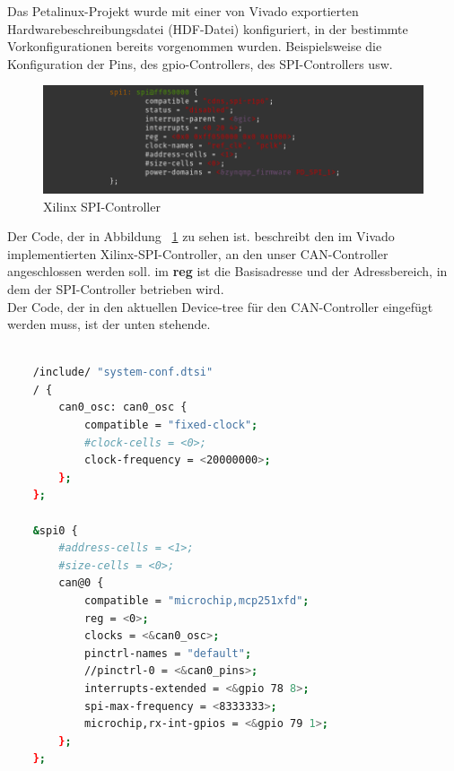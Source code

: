 Das Petalinux-Projekt wurde mit einer von Vivado exportierten Hardwarebeschreibungsdatei (HDF-Datei) konfiguriert, in der bestimmte Vorkonfigurationen bereits vorgenommen wurden. Beispielsweise die Konfiguration der Pins, des gpio-Controllers, des SPI-Controllers usw. 

\begin{figure}[H]
	\begin{center}		\includegraphics[width=1\textwidth]{./images/xilinx_spi_controller.jpg}
	\end{center}
	\vspace{-5pt}
	\caption[Xilinx SPI-Controller]{Xilinx SPI-Controller} %
	\label{fig:deviceTree:spi:controller}
	\vspace{-5pt}
\end{figure}

Der Code, der in Abbildung ~\ref{fig:deviceTree:spi:controller} zu sehen ist. beschreibt den im Vivado implementierten Xilinx-SPI-Controller, an den unser CAN-Controller angeschlossen werden soll. im \textbf{reg} ist die Basisadresse und der Adressbereich, in dem der SPI-Controller betrieben wird. \\
Der Code, der in den aktuellen Device-tree für den CAN-Controller eingefügt werden muss, ist der unten stehende.
\begin{lstlisting}[backgroundcolor = \color{lightgray},basicstyle=\scriptsize\ttfamily,caption={Device-tree Eintrag für den mcp251xfd CAN-Controller},label=lst:device:tree:mcp,language=bash,framexleftmargin = 2em]
	
	/include/ "system-conf.dtsi"
	/ {
		can0_osc: can0_osc {
			compatible = "fixed-clock";
			#clock-cells = <0>;
			clock-frequency = <20000000>;
		};
	};
	
	&spi0 {
		#address-cells = <1>;
		#size-cells = <0>;
		can@0 {
			compatible = "microchip,mcp251xfd";
			reg = <0>;
			clocks = <&can0_osc>;
			pinctrl-names = "default";
			//pinctrl-0 = <&can0_pins>;
			interrupts-extended = <&gpio 78 8>;
			spi-max-frequency = <8333333>;
			microchip,rx-int-gpios = <&gpio 79 1>;
		};
	};
\end{lstlisting}

